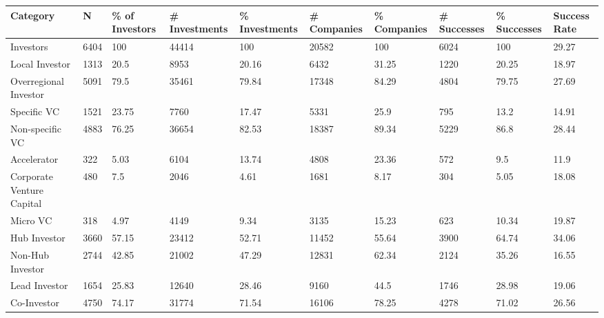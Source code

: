 \begin{tabular}{llllllllll}
  \toprule
Category & N & \% of Investors & # Investments & \% Investments & # Companies & \% Companies & # Successes & \% Successes & Success Rate \\ 
  \midrule
Investors & 6404 & 100 & 44414 & 100 & 20582 & 100 & 6024 & 100 & 29.27 \\ 
  Local Investor & 1313 & 20.5 & 8953 & 20.16 & 6432 & 31.25 & 1220 & 20.25 & 18.97 \\ 
  Overregional Investor & 5091 & 79.5 & 35461 & 79.84 & 17348 & 84.29 & 4804 & 79.75 & 27.69 \\ 
  Specific VC & 1521 & 23.75 & 7760 & 17.47 & 5331 & 25.9 & 795 & 13.2 & 14.91 \\ 
  Non-specific VC & 4883 & 76.25 & 36654 & 82.53 & 18387 & 89.34 & 5229 & 86.8 & 28.44 \\ 
  Accelerator & 322 & 5.03 & 6104 & 13.74 & 4808 & 23.36 & 572 & 9.5 & 11.9 \\ 
  Corporate Venture Capital & 480 & 7.5 & 2046 & 4.61 & 1681 & 8.17 & 304 & 5.05 & 18.08 \\ 
  Micro VC & 318 & 4.97 & 4149 & 9.34 & 3135 & 15.23 & 623 & 10.34 & 19.87 \\ 
  Hub Investor & 3660 & 57.15 & 23412 & 52.71 & 11452 & 55.64 & 3900 & 64.74 & 34.06 \\ 
  Non-Hub Investor & 2744 & 42.85 & 21002 & 47.29 & 12831 & 62.34 & 2124 & 35.26 & 16.55 \\ 
  Lead Investor & 1654 & 25.83 & 12640 & 28.46 & 9160 & 44.5 & 1746 & 28.98 & 19.06 \\ 
  Co-Investor & 4750 & 74.17 & 31774 & 71.54 & 16106 & 78.25 & 4278 & 71.02 & 26.56 \\ 
   \bottomrule
\end{tabular}
